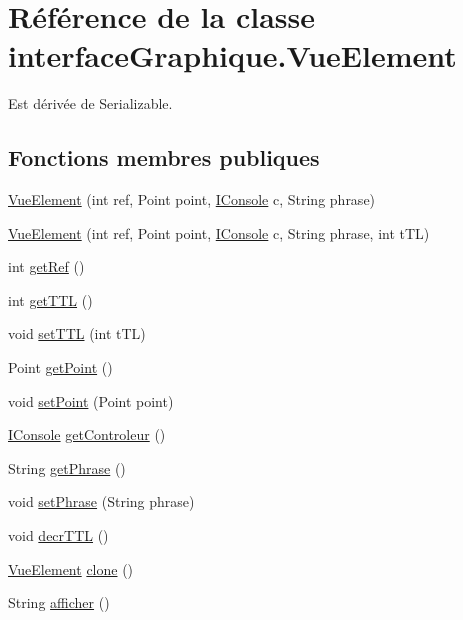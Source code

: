 \hypertarget{classinterface_graphique_1_1_vue_element}{\section{Référence de la classe interface\-Graphique.\-Vue\-Element}
\label{classinterface_graphique_1_1_vue_element}
}


Est dérivée de Serializable.

\subsection*{Fonctions membres publiques}
\begin{DoxyCompactItemize}
\item 
\hyperlink{classinterface_graphique_1_1_vue_element_ab8ebbd59c0c8dc5af23948aab5b95647}{Vue\-Element} (int ref, Point point, \hyperlink{interfacecontrole_1_1_i_console}{I\-Console} c, String phrase)
\item 
\hyperlink{classinterface_graphique_1_1_vue_element_a3da689d3d800924840f46b6444e5231d}{Vue\-Element} (int ref, Point point, \hyperlink{interfacecontrole_1_1_i_console}{I\-Console} c, String phrase, int t\-T\-L)
\item 
int \hyperlink{classinterface_graphique_1_1_vue_element_a9b8fbacb64fa2ce63df3ec91da2cd527}{get\-Ref} ()
\item 
int \hyperlink{classinterface_graphique_1_1_vue_element_ae212ad54e7caea58899a8516900a8907}{get\-T\-T\-L} ()
\item 
void \hyperlink{classinterface_graphique_1_1_vue_element_a4839fb0147cff7d3375529a62b48c285}{set\-T\-T\-L} (int t\-T\-L)
\item 
Point \hyperlink{classinterface_graphique_1_1_vue_element_ac6c5de4240dcf3639b4c8d9f1c1b153e}{get\-Point} ()
\item 
void \hyperlink{classinterface_graphique_1_1_vue_element_a089d06e5795e0848f91946a88295013f}{set\-Point} (Point point)
\item 
\hyperlink{interfacecontrole_1_1_i_console}{I\-Console} \hyperlink{classinterface_graphique_1_1_vue_element_ae8834f1bd7fc6f90809a69accb54e011}{get\-Controleur} ()
\item 
String \hyperlink{classinterface_graphique_1_1_vue_element_a7fa311f60d824a0c3af6d9e8331b601e}{get\-Phrase} ()
\item 
void \hyperlink{classinterface_graphique_1_1_vue_element_a3041521b6281d34a24e21aa9682a77db}{set\-Phrase} (String phrase)
\item 
void \hyperlink{classinterface_graphique_1_1_vue_element_a5857a4c3562d923e0bb1b86b5d1d72fd}{decr\-T\-T\-L} ()
\item 
\hyperlink{classinterface_graphique_1_1_vue_element}{Vue\-Element} \hyperlink{classinterface_graphique_1_1_vue_element_a965cb6812d04c2b5b0eaaeab458bc217}{clone} ()
\item 
String \hyperlink{classinterface_graphique_1_1_vue_element_a1bd00750328ef1d788b982597b929fb8}{afficher} ()
\end{DoxyCompactItemize}


